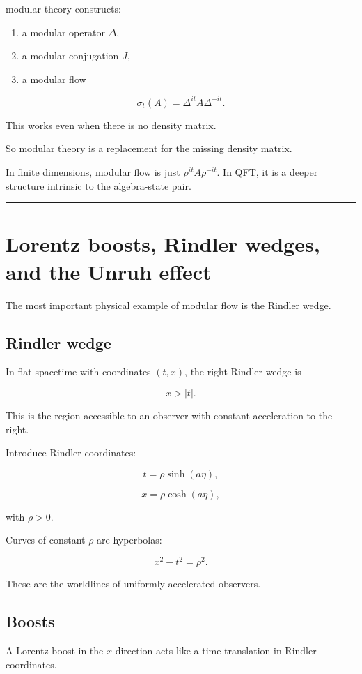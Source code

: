 \documentclass[11pt,a4paper]{article}
\begin{document}
modular theory constructs:

\begin{enumerate}
  \item a modular operator $\Delta$,
  \item a modular conjugation $J$,
  \item a modular flow
\end{enumerate}

\[
\sigma_t(A)=\Delta^{it}A\Delta^{-it}.
\]

This works even when there is no density matrix.

So modular theory is a replacement for the missing density matrix.

In finite dimensions, modular flow is just $\rho^{it}A\rho^{-it}$. In QFT, it is a deeper structure intrinsic to the algebra-state pair.

\medskip\hrule\medskip

\section{Lorentz boosts, Rindler wedges, and the Unruh effect}

The most important physical example of modular flow is the Rindler wedge.

\subsection{Rindler wedge}

In flat spacetime with coordinates $(t,x)$, the right Rindler wedge is

\[
x>|t|.
\]

This is the region accessible to an observer with constant acceleration to the right.

Introduce Rindler coordinates:

\[
t=\rho\sinh(a\eta),
\]

\[
x=\rho\cosh(a\eta),
\]

with $\rho>0$.

Curves of constant $\rho$ are hyperbolas:

\[
x^2-t^2=\rho^2.
\]

These are the worldlines of uniformly accelerated observers.

\subsection{Boosts}

A Lorentz boost in the $x$-direction acts like a time translation in Rindler coordinates.
\end{document}
